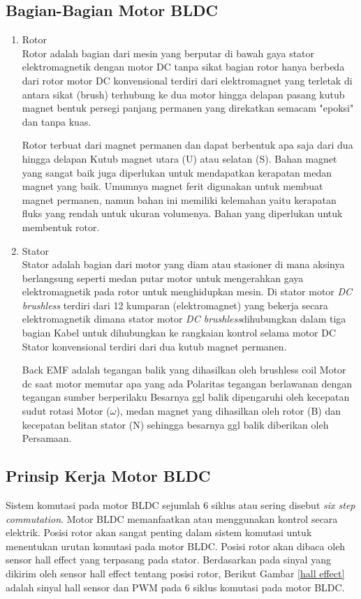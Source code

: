 \subsection{Bagian-Bagian Motor BLDC}
\begin{enumerate}
    \item Rotor\\
    Rotor adalah bagian dari mesin yang berputar di bawah gaya
stator elektromagnetik dengan motor DC tanpa sikat
bagian rotor hanya berbeda dari rotor motor DC konvensional
terdiri dari elektromagnet yang terletak di antara sikat (brush)
terhubung ke dua motor hingga delapan pasang kutub magnet
bentuk persegi panjang permanen yang direkatkan
semacam "epoksi" dan tanpa kuas.

Rotor terbuat dari magnet permanen dan dapat berbentuk apa saja dari dua hingga delapan
Kutub magnet utara (U) atau selatan (S). Bahan magnet yang sangat baik
juga diperlukan untuk mendapatkan kerapatan medan magnet yang baik.
Umumnya magnet ferit digunakan untuk membuat magnet permanen, namun bahan ini memiliki kelemahan yaitu kerapatan fluks yang rendah untuk ukuran volumenya.
Bahan yang diperlukan untuk membentuk rotor. 

\item Stator\\
Stator adalah bagian dari motor yang diam atau stasioner di mana aksinya berlangsung
seperti medan putar motor untuk mengerahkan gaya elektromagnetik pada rotor
untuk menghidupkan mesin. Di stator motor \textit{DC brushless}
terdiri dari 12 kumparan (elektromagnet) yang bekerja secara elektromagnetik
dimana stator motor \textit{DC brushless}dihubungkan dalam tiga bagian
Kabel untuk dihubungkan ke rangkaian kontrol selama motor DC
Stator konvensional terdiri dari dua kutub magnet permanen.

Back EMF adalah tegangan balik yang dihasilkan oleh brushless coil
Motor dc saat motor memutar apa yang ada
Polaritas tegangan berlawanan dengan tegangan sumber
berperilaku Besarnya ggl balik dipengaruhi oleh kecepatan sudut rotasi
Motor ($\omega$), medan magnet yang dihasilkan oleh rotor (B) dan kecepatan
belitan stator (N) sehingga besarnya ggl balik diberikan oleh Persamaan.
 
\end{enumerate}
\subsection{Prinsip Kerja Motor BLDC}
Sistem komutasi pada motor BLDC sejumlah 6 siklus atau sering disebut \textit{six step commutation}. Motor BLDC memanfaatkan atau menggunakan kontrol secara elektrik. Posisi rotor akan sangat penting dalam sistem komutasi untuk menentukan urutan komutasi pada motor BLDC. Posisi rotor akan dibaca oleh sensor hall effect yang terpasang pada stator. Berdasarkan pada sinyal yang dikirim oleh sensor hall effect tentang posisi rotor, Berikut Gambar \ref{hall effect} adalah sinyal hall sensor dan PWM pada 6 siklus komutasi pada motor BLDC.

